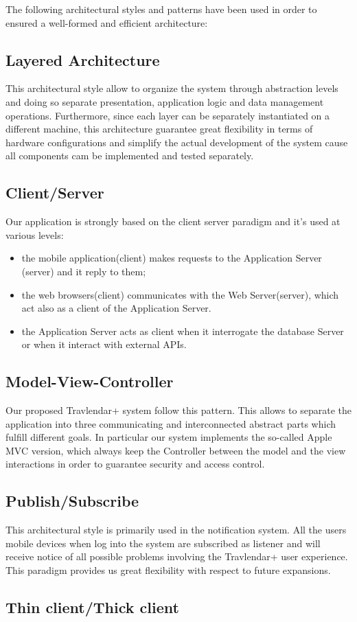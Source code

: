 The following architectural styles and patterns have been used in order to ensured a well-formed and efficient architecture:

\subsection{Layered Architecture}
\label{subsect:Layered Architecture}
This architectural style allow to organize the system through abstraction levels and doing so separate presentation, application logic and data management operations. Furthermore, since each layer can be separately instantiated on a
different machine, this architecture guarantee great flexibility in terms of hardware configurations and simplify the actual development of the system cause all components cam be implemented and tested separately.

\subsection{Client/Server}
\label{subsect:Client/Server}
Our application is strongly based on the client server paradigm and it's used at various levels:
\begin{itemize}
	\item the mobile application(client) makes requests to the Application Server (server) and it reply to them;
	\item the web browsers(client) communicates with the Web Server(server), which act also as a client of the Application Server.
	\item the Application Server acts as client when it interrogate the database Server or when it interact with external APIs.
\end{itemize}

\subsection{Model-View-Controller}
\label{subsect:Model-View-Controller}
Our proposed Travlendar+ system follow this pattern. This allows to separate the application into three communicating and interconnected abstract parts which fulfill different goals. In particular our system implements the so-called Apple MVC version, which always keep the Controller between the model and the view interactions in order to guarantee security and  access control. 

\subsection{Publish/Subscribe}
\label{subsect:Publish/Subscribe}
This architectural style is primarily used in the notification system. All the users mobile devices when log into the system are subscribed as listener and will receive notice of all possible problems involving the Travlendar+ user experience. This paradigm provides us great flexibility with respect to future expansions.

\subsection{Thin client/Thick client}
\label{subsect:Thin client/Thick client}

